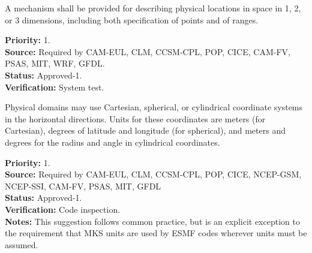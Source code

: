 


A mechanism shall be provided for describing physical locations in space in 1,
2, or 3 dimensions, including both specification of points and of ranges.
\begin{reqlist}
{\bf Priority:} 1. \\
{\bf Source:} Required by CAM-EUL, CLM, CCSM-CPL, POP, CICE, 
              CAM-FV, PSAS, MIT, WRF, GFDL. \\
{\bf Status:} Approved-1. \\
{\bf Verification:} System test.
\end{reqlist}



Physical domains may use Cartesian, spherical, or cylindrical coordinate
systems in the horizontal directions.  Units for these coordinates are meters
(for Cartesian), degrees of latitude and longitude (for spherical), and meters
and degrees for the radius and angle in cylindrical coordinates.

\begin{reqlist}
{\bf Priority:} 1. \\
{\bf Source:} Required by CAM-EUL, CLM, CCSM-CPL, POP, CICE, NCEP-GSM, NCEP-SSI, CAM-FV, PSAS, MIT, GFDL \\
{\bf Status:} Approved-1. \\
{\bf Verification:} Code inspection.\\
{\bf Notes:}  This suggestion follows common practice, but is an explicit
exception to the requirement that MKS units are used by ESMF codes wherever
units must be assumed. 
\end{reqlist}


